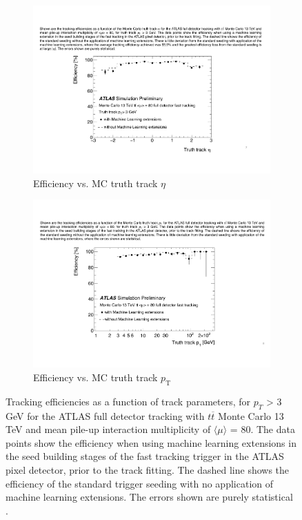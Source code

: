 \begin{figure}[!htbp]
\centering
    \begin{subfigure}[a]{0.86\textwidth}
        \includegraphics[width=\linewidth]{images/4-ml-based-predictor/efficiency_eta.pdf}
        \caption{Efficiency vs. MC truth track $\eta$}
    \label{fig:efficiencies-ml-hit-pair-predictor-eta}
    \end{subfigure}
    \hfill
    \begin{subfigure}[b]{0.86\textwidth}
        \centering
        \includegraphics[width=\linewidth]{images/4-ml-based-predictor/efficiency_pT.pdf}
        \caption{Efficiency vs. MC truth track $p_{\mathrm{T}}$}
    \label{fig:efficiencies-ml-hit-pair-predictor-pt}
    \end{subfigure}
\caption{Tracking efficiencies as a function of track parameters, for $p_{T}$ > 3 GeV for the ATLAS full detector tracking with $t\overline{t}$ Monte Carlo 13 TeV and mean pile-up interaction multiplicity of $\langle \mu \rangle$ = 80. The data points show the efficiency when using machine learning extensions in the seed building stages of the fast tracking trigger in the ATLAS pixel detector, prior to the track fitting. The dashed line shows the efficiency of the standard trigger seeding with no application of machine learning extensions. The errors shown are purely statistical \cite{public-hlt}. }
\label{fig:efficiencies-ml-hit-pair-predictor}
\end{figure}



